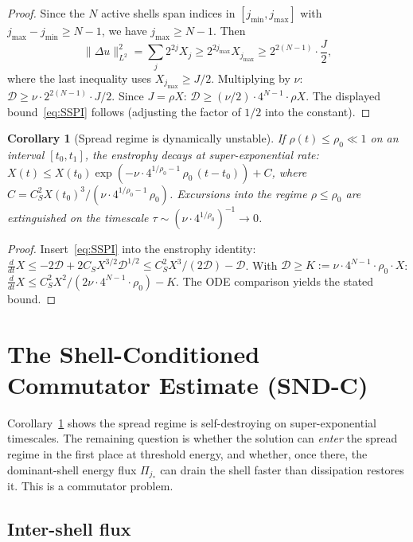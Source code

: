 \documentclass[11pt]{article}
\newtheorem{corollary}[theorem]{Corollary}
\newcommand{\norm}[2]{\|{#1}\|_{#2}}
\newcommand{\ddt}{\tfrac{d}{dt}}
\newcommand{\DD}{\mathcal{D}}
\begin{document}
\begin{proof}
Since the $N$ active shells span indices in $[j_{\min},j_{\max}]$
with $j_{\max}-j_{\min}\ge N-1$, we have $j_{\max}\ge N-1$.
Then
\[
  \norm{\Delta u}{L^2}^2
  = \sum_j 2^{2j}X_j
  \ge 2^{2j_{\max}}X_{j_{\max}}
  \ge 2^{2(N-1)}\cdot\frac{J}{2},
\]
where the last inequality uses $X_{j_{\max}}\ge J/2$.
Multiplying by $\nu$:
$\DD\ge\nu\cdot 2^{2(N-1)}\cdot J/2$.
Since $J=\rho X$: $\DD\ge(\nu/2)\cdot 4^{N-1}\cdot\rho X$.
The displayed bound~\eqref{eq:SSPI} follows (adjusting the
factor of $1/2$ into the constant).
\end{proof}

\begin{corollary}[Spread regime is dynamically unstable]
\label{cor:unstable}
If $\rho(t)\le\rho_0\ll1$ on an interval $[t_0,t_1]$,
the enstrophy decays at super-exponential rate:
$X(t)\le X(t_0)\exp(-\nu\cdot 4^{1/\rho_0-1}\,\rho_0\,(t-t_0)) + C$,
where $C = C_S^2 X(t_0)^3/(\nu\cdot 4^{1/\rho_0-1}\,\rho_0)$.
Excursions into the regime $\rho\le\rho_0$ are extinguished
on the timescale $\tau\sim(\nu\cdot 4^{1/\rho_0})^{-1}\to0$.
\end{corollary}

\begin{proof}
Insert~\eqref{eq:SSPI} into the enstrophy identity:
$\ddt X\le -2\DD + 2C_S X^{3/2}\DD^{1/2}
\le C_S^2 X^3/(2\DD) - \DD$.
With $\DD\ge K := \nu\cdot 4^{N-1}\cdot\rho_0\cdot X$:
$\ddt X\le C_S^2 X^2/(2\nu\cdot 4^{N-1}\cdot\rho_0) - K$.
The ODE comparison yields the stated bound.
\end{proof}

\section{The Shell-Conditioned Commutator Estimate (SND-C)}

Corollary~\ref{cor:unstable} shows the spread regime is self-destroying
on super-exponential timescales.
The remaining question is whether the solution can \emph{enter}
the spread regime in the first place at threshold energy,
and whether, once there, the dominant-shell energy flux $\Pi_{j_*}$
can drain the shell faster than dissipation restores it.
This is a commutator problem.

\subsection{Inter-shell flux}
\end{document}
